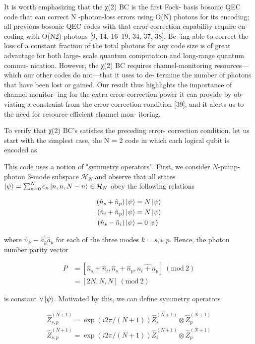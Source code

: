 \documentclass[12]{amsart}
\newcommand\0{\mathbf{0}}
\newcommand\<{\langle}
\renewcommand\>{\rangle}
\renewcommand\mod[1]{\ (\mathrm{mod}\ #1)}
\begin{document}
It is worth emphasizing that the χ(2) BC is the first Fock- basis bosonic QEC code that can correct N -photon-loss errors using O(N) photons for its encoding; all previous bosonic QEC codes with that error-correction capability require en- coding with O(N2) photons [9, 14, 16–19, 34, 37, 38]. Be- ing able to correct the loss of a constant fraction of the total photons for any code size is of great advantage for both large- scale quantum computation and long-range quantum commu- nication. However, the χ(2) BC requires channel-monitoring resources—which our other codes do not—that it uses to de- termine the number of photons that have been lost or gained. Our result thus highlights the importance of channel monitor- ing for the extra error-correction power it can provide by ob- viating a constraint from the error-correction condition [39], and it alerts us to the need for resource-efficient channel mon- itoring.

To verify that χ(2) BC’s satisfies the preceding error- correction condition. let us start with the simplest case, the N = 2 code in which each logical qubit is encoded as


This code uses a notion of "symmetry operators". First, we consider $N$-pump-photon 3-mode subspace $\mathcal{H}_N$ and observe that all states $\ket{\psi} = \sum_{n=0}^N c_n \ket{n, n, N-n} \in \mathcal{H}_N$ obey the following relations

\begin{align}
\begin{split}
	(\hat{n}_s + \hat{n}_p) \ket{\psi} &= N\ket{\psi} \\
	(\hat{n}_i + \hat{n}_p) \ket{\psi} &= N\ket{\psi} \\
	(\hat{n}_s - \hat{n}_i) \ket{\psi} &= 0\ket{\psi}
\end{split}
\end{align}

where $\hat{n}_k \equiv \hat{a}_k^\dag\hat{a}_k$ for each of the three modes $k = s, i, p$. Hence, the photon number parity vector

\begin{align*}
P &= [\hat{n}_s + \hat{n}_i, \hat{n}_s + \hat{n}_p, \hat{n_i + n_p}  ] \mod 2\\
&= [2N, N, N] \mod 2
\end{align*}

is constant $\forall \ket{\psi}$. Motivated by this, we can define symmetry operators 

\begin{align*}
\hat{Z}_{s, p}^{(N + 1)} = \exp(i 2 \pi / (N+1))	\hat{Z}_{s}^{(N + 1)} \otimes \hat{Z}_{p}^{(N + 1)} \\
\hat{Z}_{s, p}^{(N + 1)} = \exp(i 2 \pi / (N+1))	\hat{Z}_{s}^{(N + 1)} \otimes \hat{Z}_{p}^{(N + 1)}
\end{align*}
\end{document}
